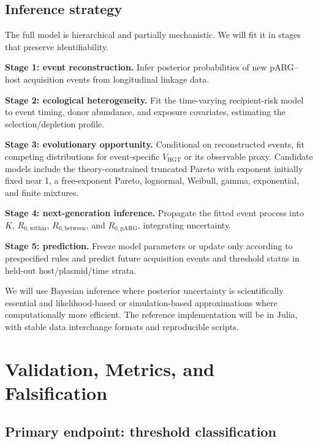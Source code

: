 \documentclass[12pt,a4paper]{article}
\newcommand{\Rwithin}{R_{0,\mathrm{within}}}
\newcommand{\Rbetween}{R_{0,\mathrm{between}}}
\newcommand{\RpARG}{R_{0,\mathrm{pARG}}}
\newcommand{\VHGT}{V_{\mathrm{HGT}}}
\begin{document}
\subsection{Inference strategy}

The full model is hierarchical and partially mechanistic. We will fit it in stages that preserve identifiability.

\textbf{Stage 1: event reconstruction.} Infer posterior probabilities of new pARG--host acquisition events from longitudinal linkage data.

\textbf{Stage 2: ecological heterogeneity.} Fit the time-varying recipient-risk model to event timing, donor abundance, and exposure covariates, estimating the selection/depletion profile.

\textbf{Stage 3: evolutionary opportunity.} Conditional on reconstructed events, fit competing distributions for event-specific $\VHGT$ or its observable proxy. Candidate models include the theory-constrained truncated Pareto with exponent initially fixed near 1, a free-exponent Pareto, lognormal, Weibull, gamma, exponential, and finite mixtures.

\textbf{Stage 4: next-generation inference.} Propagate the fitted event process into $K$, $\Rwithin$, $\Rbetween$, and $\RpARG$, integrating uncertainty.

\textbf{Stage 5: prediction.} Freeze model parameters or update only according to prespecified rules and predict future acquisition events and threshold status in held-out host/plasmid/time strata.

We will use Bayesian inference where posterior uncertainty is scientifically essential and likelihood-based or simulation-based approximations where computationally more efficient. The reference implementation will be in Julia, with stable data interchange formats and reproducible scripts.

\section{Validation, Metrics, and Falsification}

\subsection{Primary endpoint: threshold classification}
\end{document}
